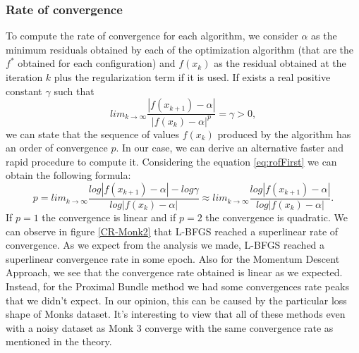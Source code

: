 \subsubsection{Rate of convergence}
To compute the rate of convergence for each algorithm, we consider $\alpha$ as the minimum residuals obtained by each of the optimization algorithm (that are the $f^{*}$ obtained for each configuration) and $f(x_{k})$ as the residual obtained at the iteration $k$ plus the regularization term if it is used. If exists a real positive constant $\gamma$ such that
\begin{equation}
\label{eq:rofFirst}
lim_{k\to \infty}\frac{|f(x_{k+1}) - \alpha |}{|f(x_{k}) - \alpha|^p} = \gamma > 0,
\end{equation}
we can state that the sequence of values $f(x_{k})$ produced by the algorithm has an order of convergence $p$. In our case, we can derive an alternative faster and rapid procedure to compute it. Considering the equation \ref{eq:rofFirst} we can obtain the following formula: 
\begin{equation}
p = lim_{k\to \infty}\frac{log |f(x_{k+1}) - \alpha | - log \gamma}{log|f(x_{k}) - \alpha|} \approx lim_{k\to \infty}\frac{log |f(x_{k+1}) - \alpha |}{log|f(x_{k}) - \alpha|}.
\end{equation}
If $p=1$ the convergence is linear and if $p=2$ the convergence is quadratic. We can observe in figure \ref{CR-Monk2} that L-BFGS reached a superlinear rate of convergence. 
As we expect from the analysis we made, L-BFGS reached a superlinear convergence rate in some epoch. Also for the Momentum Descent Approach, we see that the convergence rate obtained is linear as we expected. Instead, for the Proximal Bundle method we had some convergences rate peaks that we didn't expect. In our opinion, this can be caused by the particular loss shape of Monks dataset.
It's interesting to view that all of these methods even with a noisy dataset as Monk 3 converge with the same convergence rate as mentioned in the theory.

